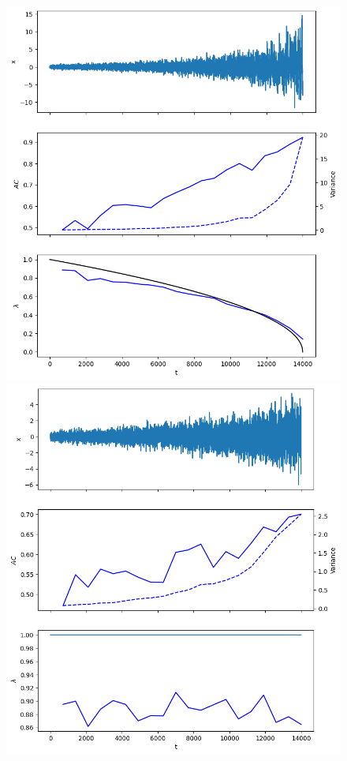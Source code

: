 \documentclass[%
thesis=student,%
coverpage=false,%
titlepage=false,%
headmarks=true, %
english,%
font=libertine, %
math=newpxtx, %
BCOR=5mm,%
coverBCOR=11mm%
]{tumbook}
\begin{document}
\begin{figure}
    \begin{minipage}{0.49\textwidth}
        \centering
        \includegraphics[width=\textwidth]{figures/true_positive.png}
    \end{minipage}
    \hfill
    \begin{minipage}{0.49\textwidth}
        \centering
        \includegraphics[width=\textwidth]{figures/false_positives.png}

\end{minipage}
\end{figure}
\end{document}
